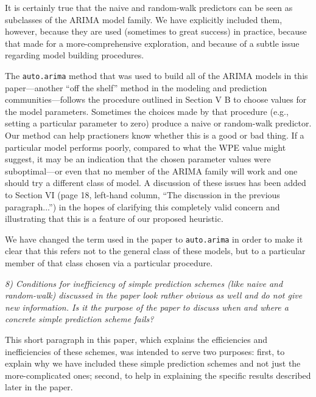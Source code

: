 \documentclass[12pt]{article}
\begin{document}
It is certainly true that the naive and random-walk predictors can be
seen as subclasses of the ARIMA model family.  We have explicitly
included them, however, because they are used (sometimes to great
success) in practice, because that made for a more-comprehensive
exploration, and because of a subtle issue regarding model building
procedures.

The {\tt auto.arima} method that was used to build all of the ARIMA
models in this paper---another ``off the shelf'' method in the
modeling and prediction communities---follows the procedure outlined
in Section V B to choose values for the model parameters.  Sometimes
the choices made by that procedure (e.g., setting a particular
parameter to zero) produce a naive or random-walk predictor.  Our
method can help practioners know whether this is a good or bad thing.
If a particular model performs poorly, compared to what the WPE value
might suggest, it may be an indication that the chosen parameter
values were suboptimal---or even that no member of the ARIMA family
will work and one should try a different class of model.  A discussion
of these issues has been added to Section VI (page 18, left-hand
column, ``The discussion in the previous paragraph...'') in the hopes
of clarifying this completely valid concern and illustrating that this
is a feature of our proposed heuristic.


We have changed the term used in the paper to {\tt auto.arima} in
order to make it clear that this refers not to the general class of
these models, but to a particular member of that class chosen via a
particular procedure.

\smallskip

\emph{8) Conditions for inefficiency of simple prediction schemes
  (like naive and random-walk) discussed in the paper look rather
  obvious as well and do not give new information. Is it the purpose
  of the paper to discuss when and where a concrete simple prediction
  scheme fails?}

This short paragraph in this paper, which explains the efficiencies
and inefficiencies of these schemes, was intended to serve two
purposes: first, to explain why we have included these simple
prediction schemes and not just the more-complicated ones; second, to
help in explaining the specific results described later in the paper.
\end{document}
